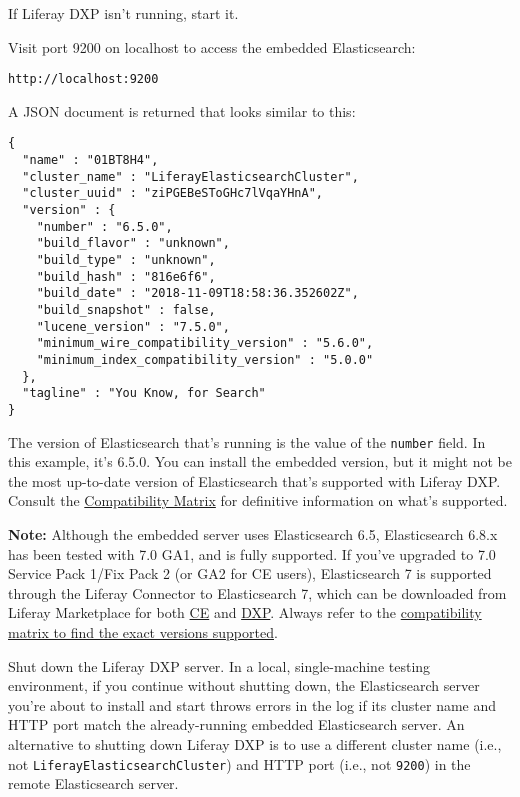 If Liferay DXP isn't running, start it.

Visit port 9200 on localhost to access the embedded Elasticsearch:

\begin{verbatim}
http://localhost:9200
\end{verbatim}

A JSON document is returned that looks similar to this:

\begin{verbatim}
{
  "name" : "01BT8H4",
  "cluster_name" : "LiferayElasticsearchCluster",
  "cluster_uuid" : "ziPGEBeSToGHc7lVqaYHnA",
  "version" : {
    "number" : "6.5.0",
    "build_flavor" : "unknown",
    "build_type" : "unknown",
    "build_hash" : "816e6f6",
    "build_date" : "2018-11-09T18:58:36.352602Z",
    "build_snapshot" : false,
    "lucene_version" : "7.5.0",
    "minimum_wire_compatibility_version" : "5.6.0",
    "minimum_index_compatibility_version" : "5.0.0"
  },
  "tagline" : "You Know, for Search"
}
\end{verbatim}

The version of Elasticsearch that's running is the value of the
\texttt{number} field. In this example, it's 6.5.0. You can install the
embedded version, but it might not be the most up-to-date version of
Elasticsearch that's supported with Liferay DXP. Consult the
\href{https://help.liferay.com/hc/en-us/articles/360016511651}{Compatibility
Matrix} for definitive information on what's supported.

\noindent\hrulefill

\textbf{Note:} Although the embedded server uses Elasticsearch 6.5,
Elasticsearch 6.8.x has been tested with 7.0 GA1, and is fully
supported. If you've upgraded to 7.0 Service Pack 1/Fix Pack 2 (or GA2
for CE users), Elasticsearch 7 is supported through the Liferay
Connector to Elasticsearch 7, which can be downloaded from Liferay
Marketplace for both
\href{https://web.liferay.com/en/marketplace/-/mp/application/170642090}{CE}
and
\href{https://web.liferay.com/en/marketplace/-/mp/application/170390307}{DXP}.
Always refer to the
\href{https://help.liferay.com/hc/en-us/articles/360016511651}{compatibility
matrix to find the exact versions supported}.

\noindent\hrulefill

Shut down the Liferay DXP server. In a local, single-machine testing
environment, if you continue without shutting down, the Elasticsearch
server you're about to install and start throws errors in the log if its
cluster name and HTTP port match the already-running embedded
Elasticsearch server. An alternative to shutting down Liferay DXP is to
use a different cluster name (i.e., not
\texttt{LiferayElasticsearchCluster}) and HTTP port (i.e., not
\texttt{9200}) in the remote Elasticsearch server.

